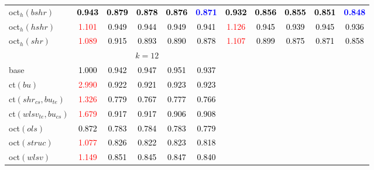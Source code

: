 \begin{tabular}[t]{l|>{}cccc>{}c|ccccc}
oct$_h(bshr)$ & \textcolor{black}{\textbf{0.943}} & \textcolor{black}{\textbf{0.879}} & \textcolor{black}{\textbf{0.878}} & \textcolor{black}{\textbf{0.876}} & \textcolor{blue}{\textbf{0.871}} & \textcolor{black}{\textbf{0.932}} & \textcolor{black}{\textbf{0.856}} & \textcolor{black}{\textbf{0.855}} & \textcolor{black}{\textbf{0.851}} & \textcolor{blue}{\textbf{0.848}}\\
oct$_h(hshr)$ & \textcolor{red}{1.101} & \textcolor{black}{0.949} & \textcolor{black}{0.944} & \textcolor{black}{0.949} & \textcolor{black}{0.941} & \textcolor{red}{1.126} & \textcolor{black}{0.945} & \textcolor{black}{0.939} & \textcolor{black}{0.945} & \textcolor{black}{0.936}\\
oct$_h(shr)$ & \textcolor{red}{1.089} & \textcolor{black}{0.915} & \textcolor{black}{0.893} & \textcolor{black}{0.890} & \textcolor{black}{0.878} & \textcolor{red}{1.107} & \textcolor{black}{0.899} & \textcolor{black}{0.875} & \textcolor{black}{0.871} & \textcolor{black}{0.858}\\
\addlinespace[0.3em]
\multicolumn{1}{c}{} & \multicolumn{5}{c}{\textbf{$k = 12$}} & \multicolumn{5}{c}{}\\
base & \textcolor{black}{1.000} & \textcolor{black}{0.942} & \textcolor{black}{0.947} & \textcolor{black}{0.951} & \textcolor{black}{0.937} &  &  &  &  & \\
ct$(bu)$ & \textcolor{red}{2.990} & \textcolor{black}{0.922} & \textcolor{black}{0.921} & \textcolor{black}{0.923} & \textcolor{black}{0.923} &  &  &  &  & \\
ct$(shr_{cs}, bu_{te})$ & \textcolor{red}{1.326} & \textcolor{black}{0.779} & \textcolor{black}{0.767} & \textcolor{black}{0.777} & \textcolor{black}{0.766} &  &  &  &  & \\
ct$(wlsv_{te}, bu_{cs})$ & \textcolor{red}{1.679} & \textcolor{black}{0.917} & \textcolor{black}{0.917} & \textcolor{black}{0.906} & \textcolor{black}{0.908} &  &  &  &  & \\
oct$(ols)$ & \textcolor{black}{0.872} & \textcolor{black}{0.783} & \textcolor{black}{0.784} & \textcolor{black}{0.783} & \textcolor{black}{0.779} &  &  &  &  & \\
oct$(struc)$ & \textcolor{red}{1.077} & \textcolor{black}{0.826} & \textcolor{black}{0.822} & \textcolor{black}{0.823} & \textcolor{black}{0.818} &  &  &  &  & \\
oct$(wlsv)$ & \textcolor{red}{1.149} & \textcolor{black}{0.851} & \textcolor{black}{0.845} & \textcolor{black}{0.847} & \textcolor{black}{0.840} &  &  &  &  & \\

\end{tabular}
